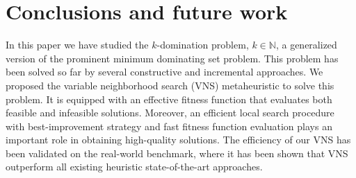 \documentclass[dvipsnames,format=sigconf]{acmart} %
\begin{document}

\begin{comment}
    
\pgfplotstableread{ %
	City	k1	k2	k4
	Manchester	844.078	1608.695	2584.787
	Nottingham	85.132	1125.304	1827.64
	Belfast	66.681	865.443	1800.359
	Sunderland	44.395	187.461	2464.102
	Leicester	233.02	462.418	1729.272
	Newcastle	88.577	378.578	1147.646
	Leeds	132.67	291.423	1078.052
	Liverpool	192.537	239.716	981.006
	Bristol	129.058	571.793	638.25
	Coventry	144.585	300.407	826.953
	Brighton	89.172	292.017	858.973
	Sheffield	78.21	289.042	850.464
	Plymouth	55.003	205.265	919.927
	Cardiff	41.944	181.9	679.325
	Exeter	52.443	285.106	387.588
	Bath	60.934	256.686	285.744
	Glasgow	90.929	110.067	376.057
	York	28.401	111.923	359.89
	Southampton	7.778	147.781	203.324
	Oxford	18.758	6.93	23.79
}\testdata

\begin{figure}
	\begin{tikzpicture}
		\begin{axis}[
			legend style={legend columns=1,at={(1,1)},anchor=north east},
			xbar stacked,   %
			bar width=5pt,
			ytick=data,     %
			yticklabels from table={\testdata}{City}  %
			]
			\addplot [fill=cyan!20!green!40] table [x=k1, meta=City,y expr=\coordindex] {\testdata};   %
			\addplot [fill=cyan!60!green!20] table [x=k2, meta=City,y expr=\coordindex] {\testdata};
			\addplot [fill=cyan!10] table [x=k4, meta=City,y expr=\coordindex] {\testdata};
			\legend{k=1, k=2,k=4}
		\end{axis}
	\end{tikzpicture}
	\caption{Average times (in seconds) of finding the best solution for small to medium sized instances.}
	\label{fig:timeSmall}  
\end{figure}

\end{comment}

 
\section{Conclusions and future work}

 
 In this paper we have studied the $k$-domination problem, $k \in \mathbb{N}$,  a generalized version of the prominent minimum dominating set problem. This problem has been solved so far by several constructive and incremental approaches. We proposed the variable neighborhood search (VNS) metaheuristic to solve this problem. It is equipped with an effective fitness function that evaluates both feasible and infeasible solutions. Moreover, an efficient local search procedure with best-improvement strategy and fast fitness function evaluation plays an important role in obtaining high-quality solutions. The efficiency of our VNS has been validated on the real-world benchmark, where it has been shown that VNS outperform all existing heuristic state-of-the-art approaches. 
 
\end{document}
